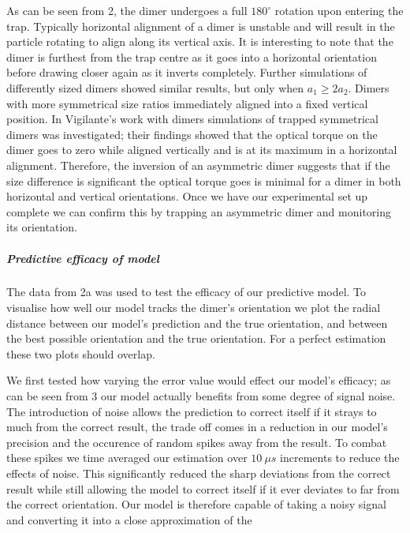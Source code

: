 \documentclass[11pt]{article}
\begin{document}
	As can be seen from \figurename{ 2}, the dimer undergoes a full $180^{\circ}$ rotation upon entering the trap. Typically horizontal alignment of a dimer is unstable and will result in the particle rotating to align along its vertical axis. It is interesting to note that the dimer is furthest from the trap centre as it goes into a horizontal orientation before drawing closer again as it inverts completely. Further simulations of differently sized dimers showed similar results, but only when $a_1 \geq 2a_2$. Dimers with more symmetrical size ratios immediately aligned into a fixed vertical position. 
	In Vigilante's work with dimers \cite{Brownian_OT} simulations of trapped symmetrical dimers was investigated; their findings showed that the optical torque on the dimer goes to zero while aligned vertically and is at its maximum in a horizontal alignment. Therefore, the inversion of an asymmetric dimer suggests that if the size difference is significant the optical torque goes is minimal for a dimer in both horizontal and vertical orientations. Once we have our experimental set up complete we can confirm this by trapping an asymmetric dimer and monitoring its orientation. 
	
	\subparagraph*{Predictive efficacy of model}
	The data from \figurename{ 2a} was used to test the efficacy of our predictive model. To visualise how well our model tracks the dimer's orientation we plot the radial distance between our model's prediction and the true orientation, and between the best possible orientation and the true orientation. For a perfect estimation these two plots should overlap. 
	
	\begin{figure}
		
	\end{figure}
	
	We first tested how varying the error value would effect our model's efficacy; as can be seen from \figurename{ 3} our model actually benefits from some degree of signal noise. The introduction of noise allows the prediction to correct itself if it strays to much from the correct result, the trade off comes in a reduction in our model's precision and the occurence of random spikes away from the result. To combat these spikes we time averaged our estimation over $10 \ \mu s$ increments to reduce the effects of noise. This significantly reduced the sharp deviations from the correct result while still allowing the model to correct itself if it ever deviates to far from the correct orientation. Our model is therefore capable of taking a noisy signal and converting it into a close approximation of the 
	
\end{document}
